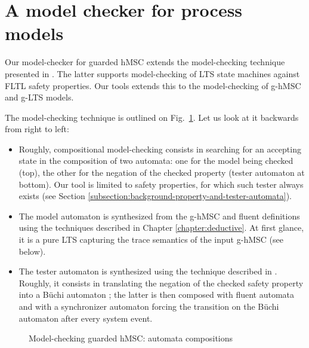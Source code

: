 \section{A model checker for process models\label{section:tool-model-checker}}

Our model-checker for guarded hMSC extends the model-checking technique presented in \cite{Giannakopoulou:2003}. The latter supports model-checking of LTS state machines against FLTL safety properties. Our tools extends this to the model-checking of g-hMSC and g-LTS models. 

The model-checking technique is outlined on Fig.~\ref{image:model-checking-technique}. Let us look at it backwards from right to left:
\begin{itemize}
\item Roughly, compositional model-checking consists in searching for an accepting state in the composition of two automata: one for the model being checked (top), the other for the negation of the checked property (tester automaton at bottom). Our tool is limited to safety properties, for which such tester always exists (see Section \ref{subsection:background-property-and-tester-automata}).
\item The model automaton is synthesized from the g-hMSC and fluent definitions using the techniques described in Chapter \ref{chapter:deductive}. At first glance, it is a pure LTS capturing the trace semantics of the input g-hMSC (see below).
\item The tester automaton is synthesized using the technique described in \cite{Giannakopoulou:2003}. Roughly, it consists in translating the negation of the checked safety property into a B\"uchi automaton \cite{Giannakopoulou:2002}; the latter is then composed with fluent automata and with a synchronizer automaton forcing the transition on the B\"uchi automaton after every system event. 
\end{itemize} 

\begin{figure}
\centering{}
  \caption{Model-checking guarded hMSC: automata compositions\label{image:model-checking-technique}}
\end{figure}

